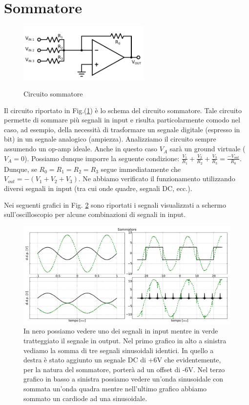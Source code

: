 \section{Sommatore}

\begin{figure}
	\caption{Circuito sommatore}
	\includegraphics[width=65mm]{ccsum.pdf}
	\label{fig:ccsum}
\end{figure}

Il circuito riportato in Fig.(\ref{fig:ccsum}) è lo schema del circuito sommatore.
Tale circuito permette di sommare più segnali in input e risulta particolarmente comodo nel caso, ad esempio, della necessità di trasformare un segnale digitale (espresso in bit) in un segnale analogico (ampiezza).
Analizziamo il circuito sempre assumendo un op-amp ideale.
Anche in questo caso $V_A$ sarà un ground virtuale ($V_A = 0$).
Possiamo dunque imporre la seguente condizione: $\frac{V_1}{R_1}+\frac{V_2}{R_2}+\frac{V_3}{R_3}=\frac{-V_{out}}{R_0}$.
Dunque, se $R_0=R_1=R_2=R_3$ segue immediatamente che $V_{out}=-(V_1+V_2+V_3)$.
Ne abbiamo verificato il funzionamento utilizzando diversi segnali in input (tra cui onde quadre, segnali DC, ecc.).

Nei seguenti grafici in Fig. \ref{fig:sum} sono riportati i segnali visualizzati a schermo sull'oscilloscopio per alcune combinazioni di segnali in input.

\begin{figure}[h]
	\centering
			\includegraphics[width=.9\textwidth]{sum_serie_05.pdf}
			\caption{In nero possiamo vedere uno dei segnali in input mentre in verde tratteggiato il segnale in output. Nel primo grafico in alto a sinistra vediamo la somma di tre segnali sinusoidali identici. In quello a destra è stato aggiunto un segnale DC di +6V che evidentemente, per la natura del sommatore, porterà ad un offset di -6V. Nel terzo grafico in basso a sinistra possiamo vedere un'onda sinusoidale con sommata un'onda quadra mentre nell'ultimo grafico abbiamo sommato un cardiode ad una sinusoidale.}
			\label{fig:sum}
\end{figure}

